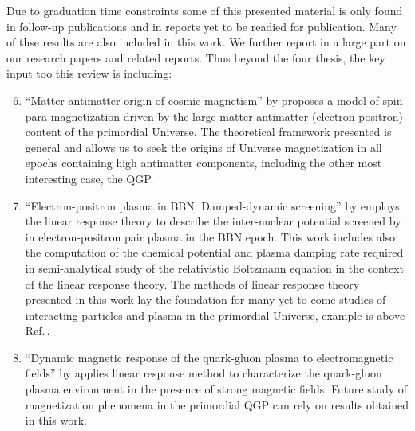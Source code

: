 Due to graduation time constraints some of this presented material is only found in follow-up publications and in reports yet to be readied for publication. Many of thse results are also included in this work. We further report in a large part on our research papers and related reports. Thus beyond the four thesis, the key input too this review is including:
\begin{enumerate}
\setcounter{enumi}{5}
%
\item ``Matter-antimatter origin of cosmic magnetism'' by  proposes a model of spin para-magnetization driven by the large matter-antimatter (electron-positron) content of the primordial Universe. {\color{black} The theoretical framework presented is general and allows us to seek the origins of Universe magnetization in all epochs containing high antimatter components, including the other most interesting case, the QGP.}
%
\item ``Electron-positron plasma in BBN: Damped-dynamic screening'' by  employs the linear response theory to describe the inter-nuclear potential screened by in electron-positron pair plasma in the BBN epoch. This work includes also the computation of the chemical potential and plasma damping rate required in semi-analytical study of the relativistic Boltzmann equation in the context of the linear response theory. {\color{black} The methods of linear response theory presented in this work lay the foundation for many yet to come studies of interacting particles and plasma in the primordial Universe, example is above Ref.\,\cite{Grayson:2024uwg}.}
%
\item ``Dynamic magnetic response of the quark-gluon plasma to electromagnetic fields'' by  applies linear response method to characterize the quark-gluon plasma environment in the presence of strong magnetic fields. {\color{black} Future study of magnetization phenomena in the primordial QGP can rely on results obtained in this work.}

\end{enumerate}
